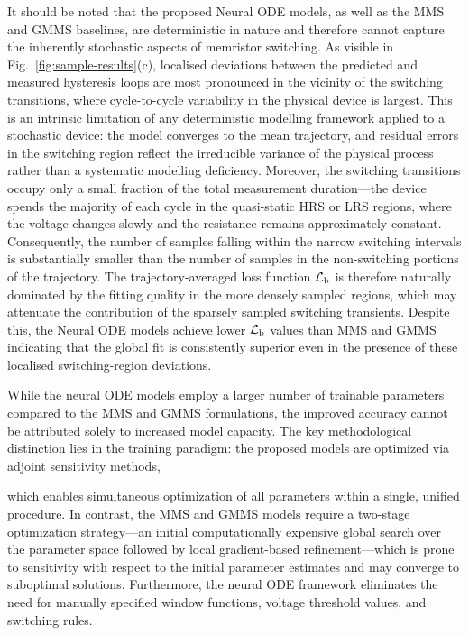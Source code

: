 \documentclass{ieeeaccess}
\begin{document}
It should be noted that the proposed Neural ODE models, as well as the MMS and GMMS baselines, are deterministic in nature and therefore cannot capture the inherently stochastic aspects of memristor switching. As visible in Fig.~\ref{fig:sample-results}(c), localised deviations between the predicted and measured hysteresis loops are most pronounced in the vicinity of the switching transitions, where cycle-to-cycle variability in the physical device is largest. This is an intrinsic limitation of any deterministic modelling framework applied to a stochastic device: the model converges to the mean trajectory, and residual errors in the switching region reflect the irreducible variance of the physical process rather than a systematic modelling deficiency. Moreover, the switching transitions occupy only a small fraction of the total measurement duration---the device spends the majority of each cycle in the quasi-static HRS or LRS regions, where the voltage changes slowly and the resistance remains approximately constant. Consequently, the number of samples falling within the narrow switching intervals is substantially smaller than the number of samples in the non-switching portions of the trajectory. The trajectory-averaged loss function \(\mathcal{L}_{\text{b}}\) is therefore naturally dominated by the fitting quality in the more densely sampled regions, which may attenuate the contribution of the sparsely sampled switching transients. Despite this, the Neural ODE models achieve lower \(\mathcal{L}_{\text{b}}\) values than MMS and GMMS  indicating that the global fit is consistently superior even in the presence of these localised switching-region deviations.

While the neural ODE models employ a larger number of trainable parameters compared to the MMS and GMMS formulations, the improved accuracy cannot be attributed solely to increased model capacity. The key methodological distinction lies in the training paradigm: the proposed models are optimized  via adjoint sensitivity methods,

which enables simultaneous optimization of all parameters within a single, unified procedure. In contrast, the  MMS and GMMS models require a two-stage optimization strategy---an initial computationally expensive global search over the parameter space followed by local gradient-based refinement---which is prone to sensitivity with respect to the initial parameter estimates and may converge to suboptimal solutions. Furthermore, the neural ODE framework eliminates the need for manually specified window functions, voltage threshold values, and switching rules.
\end{document}
